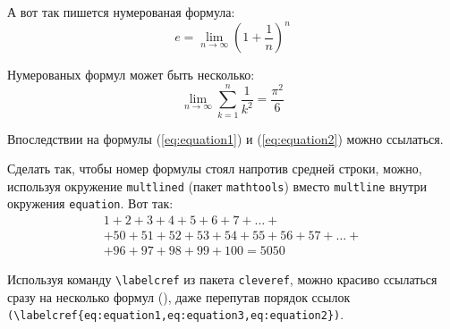 А вот так пишется нумерованая формула:
\begin{equation}
  \label{eq:equation1}
  e = \lim_{n \to \infty} \left( 1+\frac{1}{n} \right) ^n
\end{equation}

Нумерованых формул может быть несколько:
\begin{equation}
  \label{eq:equation2}
  \lim_{n \to \infty} \sum_{k=1}^n \frac{1}{k^2} = \frac{\pi^2}{6}
\end{equation}

Впоследствии на формулы (\ref{eq:equation1}) и (\ref{eq:equation2}) можно ссылаться.

Сделать так, чтобы номер формулы стоял напротив средней строки, можно, используя окружение \verb|multlined| (пакет \verb|mathtools|) вместо \verb|multline| внутри окружения \verb|equation|. Вот так:
\begin{equation} %
  \label{eq:equation3}
    \begin{multlined}
        1+ 2+3+4+5+6+7+\dots + \\ 
        + 50+51+52+53+54+55+56+57 + \dots + \\ 
        + 96+97+98+99+100=5050 
    \end{multlined}
\end{equation}

Используя команду \verb|\labelcref| из пакета \verb|cleveref|, можно
красиво ссылаться сразу на несколько формул
(), даже перепутав
порядок ссылок \verb|(\labelcref{eq:equation1,eq:equation3,eq:equation2})|.

